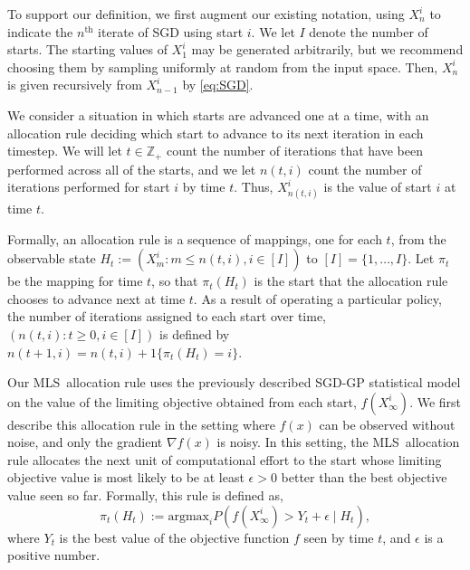 \documentclass{wscpaperproc}
\newcommand{\argmax}{\mathrm{argmax}}
\theoremstyle{wsc}
\newcommand{\abbrv}{MLS}
\begin{document}
To support our definition, we first augment our existing notation, using $X_n^i$ to indicate the $n^{\mathrm{th}}$ iterate of SGD using start $i$.   We let $I$ denote the number of starts.
The starting values of $X^i_1$ may be generated arbitrarily, but we recommend choosing them by sampling uniformly at random from the input space.  Then, $X^i_n$ is given recursively from $X^i_{n-1}$ by \eqref{eq:SGD}.

We consider a situation in which starts are advanced one at a time, with an allocation rule deciding which start to advance to its next iteration in each timestep.
We will let $t \in \mathbb{Z}_+$ count the number of iterations that have been performed across all of the starts, and we let $n(t,i)$ count the number of iterations performed for start $i$ by time $t$.
Thus, $X_{n(t,i)}^i$ is the value of start $i$ at time $t$.

Formally, an allocation rule is a sequence of mappings, one for each $t$, from the observable state $H_t := (X^i_m : m \le n(t,i), i \in [I])$ to $[I] = \{1,\ldots,I\}$.  Let $\pi_t$ be the mapping for time $t$, so that $\pi_t(H_t)$ is the start that the allocation rule chooses to advance next at time $t$.  As a result of operating a particular policy, the number of iterations assigned to each start over time, $(n(t,i) : t\ge 0, i \in [I])$ is defined by $n(t+1,i) = n(t,i) + 1\{\pi_t(H_t) = i\}$.

Our \abbrv\ allocation rule uses the previously described SGD-GP statistical model on the value of the limiting objective obtained from each start, $f(X^i_\infty)$. We first describe this allocation rule in the setting where $f(x)$ can be observed without noise, and only the gradient $\nabla f(x)$ is noisy.  In this setting, the \abbrv\ allocation rule allocates the next unit of computational effort to the start whose limiting objective value is most likely to be at least $\epsilon>0$ better than the best objective value seen so far.
Formally, this rule is defined as,
\begin{equation*}
\pi_t(H_t) := \argmax_i 
P\left(f\left(X_{\infty}^{i}\right)>Y_t+\epsilon\mid H_{t}\right),
\end{equation*}
where $Y_t$ is the best value of the objective function $f$ seen by time $t$, and $\epsilon$ is a positive number. 
\end{document}
